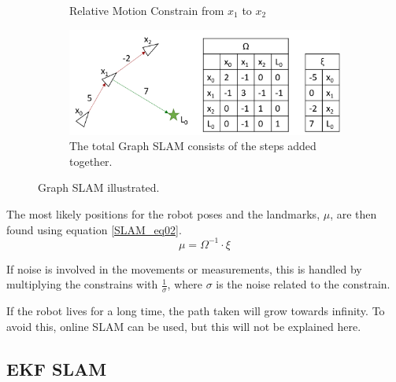 \begin{figure}[H]
\begin{subfigure}{.5\textwidth}
  \caption{Relative Motion Constrain from $x_1$ to $x_2$}
  \label{SLAM_fig04:sub4}
\end{subfigure}
\begin{subfigure}{.5\textwidth}
  \centering
  \includegraphics[width=.8\linewidth]{billeder/GraphSLAM04_5.png}
  \caption{The total Graph SLAM consists of the steps added together.}
  \label{SLAM_fig04:sub5}
\end{subfigure}
\caption{Graph SLAM illustrated.}
\label{SLAM_fig04}
\end{figure}

The most likely positions for the robot poses and the landmarks, $\mu$, are then found using equation \ref{SLAM_eq02}. 
\begin{equation}
\mu = \Omega^{-1} \cdot \xi
\label{SLAM_eq02}
\end{equation}

If noise is involved in the movements or measurements, this is handled by multiplying the constrains with $\frac{1}{\sigma}$, where $\sigma$ is the noise related to the constrain.

If the robot lives for a long time, the path taken will grow towards infinity. To avoid this, online SLAM can be used, but this will not be explained here.

\subsection{EKF SLAM}

